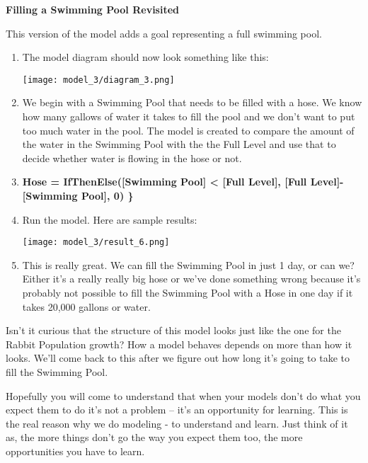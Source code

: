 \documentclass[]{memoir}
\makeatletter
\def\maxwidth{\ifdim\Gin@nat@width>\linewidth\linewidth
\else\Gin@nat@width\fi}
\let\Oldincludegraphics\includegraphics
\renewcommand{\includegraphics}[1]{\Oldincludegraphics[width=\maxwidth]{#1}}
\newcommand{\p}[1]{\textbf{{[}#1{]}}}
\makeatother
\begin{document}
\begin{oframed}\textbf{Filling a Swimming Pool Revisited} 

 This version of the model adds a goal representing a full swimming pool.

\begin{enumerate}
\item The model diagram should now look something like this: \par \begin{minipage}{\linewidth}  \centering \texttt{[image: model\_3/diagram\_3.png]}
\end{minipage}
\item 

We begin with a Swimming Pool that needs to be filled with a hose. We know how many gallows of water it takes to fill the pool and we don't want to put too much water in the pool. The model is created to compare the amount of the water in the Swimming Pool with the the Full Level and use that to decide whether water is flowing in the hose or not.


\item 

\textbf{Hose = IfThenElse(\p{Swimming Pool} < \p{Full Level}, \p{Full Level}-\p{Swimming Pool}, 0) \}}


\item Run the model. Here are sample results:\par \begin{minipage}{\linewidth}  \centering \texttt{[image: model\_3/result\_6.png]}
\end{minipage}
\item 

This is really great. We can fill the Swimming Pool in just 1 day, or can we? Either it's a really really big hose or we've done something wrong because it's probably not possible to fill the Swimming Pool with a Hose in one day if it takes 20,000 gallons or water.



\end{enumerate} \end{oframed}

Isn't it curious that the structure of this model looks just like the
one for the Rabbit Population growth? How a model behaves depends on
more than how it looks. We'll come back to this after we figure out how
long it's going to take to fill the Swimming Pool.

Hopefully you will come to understand that when your models don't do
what you expect them to do it's not a problem -- it's an opportunity for
learning. This is the real reason why we do modeling - to understand and
learn. Just think of it as, the more things don't go the way you expect
them too, the more opportunities you have to learn.
\end{document}

